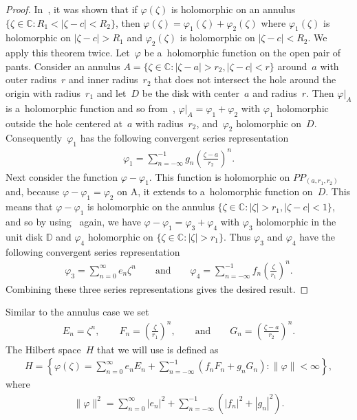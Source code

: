 \begin{proof}
In~\cite{Ahlfors}, it was shown that if $\varphi(\zeta)$ is holomorphic on an annulus $\{\zeta\in{\mathbb C}: R_1 <
|\zeta-c|<R_2\}$, then $\varphi(\zeta)=\varphi_1(\zeta)+\varphi_2(\zeta)$ where $\varphi_1(\zeta)$ is holomorphic on
$|\zeta-c|>R_1$ and $\varphi_2(\zeta)$ is holomorphic on $|\zeta-c|<R_2$.
We apply this theorem twice.
Let~$\varphi$ be a~holomorphic function on the open pair of pants.
Consider an annulus $A=\{\zeta\in{\mathbb C}: |\zeta-a|>r_2, |\zeta-c|<r\}$ around~$a$ with outer radius~$r$ and inner
radius~$r_2$ that does not intersect the hole around the origin with radius~$r_1$ and let~$D$ be the disk with
center~$a$ and radius~$r$.
Then $\varphi|_{A}$ is a~holomorphic function and so from~\cite{Ahlfors}, $\varphi|_{A}=\varphi_1+\varphi_2$ with
$\varphi_1$ holomorphic outside the hole centered at~$a$ with radius~$r_2$, and~$\varphi_2$ holomorphic on~$D$.
Consequently~$\varphi_1$ has the following convergent series representation
\begin{gather*}
\varphi_1=\sum\limits_{n=-\infty}^{-1} g_n\left(\frac{\zeta-a}{r_2}\right)^n.
\end{gather*}
Next consider the function $\varphi-\varphi_1$.
This function is holomorphic on $PP_{(a, r_1,r_2)}$ and, because $\varphi-\varphi_1=\varphi_2$ on A, it extends to
a~holomorphic function on~$D$.
This means that $\varphi-\varphi_1$ is holomorphic on the annulus $\{\zeta\in{\mathbb C}: |\zeta|>r_1, |\zeta-c|<1\}$,
and so by using~\cite{Ahlfors} again, we have $\varphi-\varphi_1=\varphi_3+\varphi_4$ with $\varphi_3$ holomorphic
in the unit disk ${\mathbb D}$ and $\varphi_4$ holomorphic on $\{\zeta\in{\mathbb C}: |\zeta|>r_1 \}$.
Thus $\varphi_3$ and $\varphi_4$ have the following convergent series representation
\begin{gather*}
\varphi_3=\sum\limits_{n=0}^\infty e_n \zeta^n
\qquad \text{and} \qquad
\varphi_4=\sum\limits_{n=-\infty}^{-1}f_n\left(\frac{\zeta}{r_1}\right)^n.
\end{gather*}
Combining these three series representations gives the desired result.
\end{proof}

Similar to the annulus case we set
\begin{gather*}
E_n=\zeta^n,
\qquad
F_n =\left(\frac{\zeta}{r_1}\right)^n,
\qquad \text{and} \qquad
G_n=\left(\frac{\zeta-a}{r_2}\right)^n.
\end{gather*}
The Hilbert space~$H$ that we will use is def\/ined as
\begin{gather}
\label{Hilbert_space}
H=\left\{\varphi(\zeta)=\sum\limits_{n=0}^\infty e_nE_n+\sum\limits_{n=-\infty}^{-1}(f_nF_n+g_nG_n):
\|\varphi\|<\infty\right\},
\end{gather}
where
\begin{gather*}
\|\varphi\|^2=\sum\limits_{n=0}^\infty |e_n|^2+\sum\limits_{n=-\infty}^{-1}\left(|f_n|^2+|g_n|^2\right).
\end{gather*}

